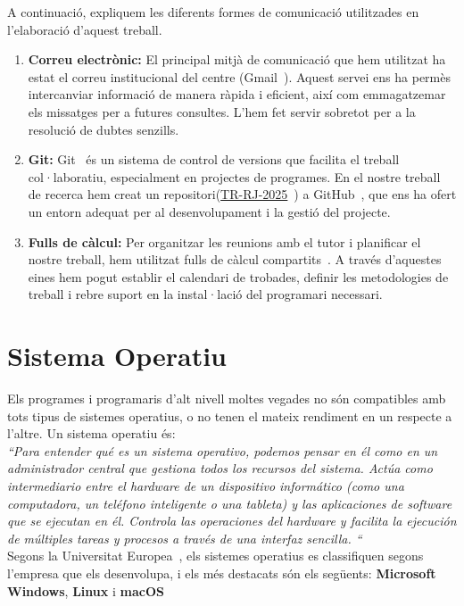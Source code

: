 A continuació, expliquem les diferents formes de comunicació utilitzades en l'elaboració d'aquest treball.
\begin{enumerate}
\clearpage
\item \textbf{Correu electrònic:} El principal mitjà de comunicació que hem utilitzat ha estat el correu institucional del centre (Gmail~\cite{Gmail}). Aquest servei ens ha permès intercanviar informació de manera ràpida i eficient, així com emmagatzemar els missatges per a futures consultes. L’hem fet servir sobretot per a la resolució de dubtes senzills.

\item \textbf{Git:} Git~\cite{git} és un sistema de control de versions que facilita el treball col·laboratiu, especialment en projectes de programes. En el nostre treball de recerca hem creat un repositori(\href{https://github.com/Rui564/TR-RJ-2025}{TR-RJ-2025}~\cite{TR-RJ-2025}) a GitHub~\cite{GitHub}, que ens ha ofert un entorn adequat per al desenvolupament i la gestió del projecte.

\item \textbf{Fulls de càlcul:} Per organitzar les reunions amb el tutor i planificar el nostre treball, hem utilitzat fulls de càlcul compartits~\cite{FullDeCàlcul}. A través d’aquestes eines hem pogut establir el calendari de trobades, definir les metodologies de treball i rebre suport en la instal·lació del programari necessari.
\end{enumerate}

\section{Sistema Operatiu}
Els programes i programaris d'alt nivell moltes vegades no són compatibles amb tots tipus de sistemes operatius, o no tenen el mateix rendiment en un respecte a l'altre. %
Un sistema operatiu és:\\
\textit{``Para entender qué es un sistema operativo, podemos pensar en él como en un administrador central que gestiona todos los recursos del sistema. Actúa como intermediario entre el hardware de un dispositivo informático (como una computadora, un teléfono inteligente o una tableta) y las aplicaciones de software que se ejecutan en él. Controla las operaciones del hardware y facilita la ejecución de múltiples tareas y procesos a través de una interfaz sencilla. ``}\\
 Segons la Universitat Europea~\cite{UniversitatEuropea}, els sistemes operatius es classifiquen segons l’empresa que els desenvolupa, i els més destacats són els següents: \textbf{Microsoft Windows}, \textbf{Linux} i \textbf{macOS}
\clearpage
